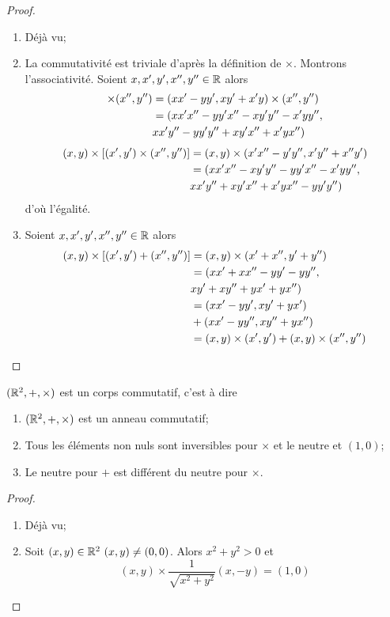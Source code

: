 \begin{proof}
  \begin{enumerate}
  \item Déjà vu;
  \item La commutativité est triviale d'après la définition de $\times$. Montrons l'associativité. Soient $x,x',y',x'',y'' \in \mathbb{R}$ alors
    \begin{align}
      [(x,y) \times (x',y')] \times (x'',y'') &= (xx'-yy',xy'+x'y) \times (x'',y'')\\
      &=(xx'x''-yy'x''-xy'y''-x'yy'', \notag \\
      &xx'y''-yy'y''+xy'x''+x'yx'')
    \end{align}
    \begin{align}
      (x,y)\times [(x',y') \times (x'',y'')] &= (x,y) \times (x'x''-y'y'',x'y''+x''y')\\
      &=(xx'x''-xy'y''-yy'x''-x'yy'', \notag \\
      & xx'y''+xy'x''+x'yx''-yy'y'')
    \end{align}
    d'où l'égalité.
  \item Soient $x,x',y',x'',y'' \in \mathbb{R}$ alors
    \begin{align}
      (x,y) \times [(x',y')+(x'',y'')] &= (x,y) \times (x'+x'',y'+y'')\\
      &=(xx'+xx''-yy'-yy'', \notag \\ &xy'+xy''+yx'+yx'')\\
      &=(xx'-yy',xy'+yx') \notag \\
      & + (xx'-yy'',xy''+yx'')\\
      &=(x,y) \times (x',y') +(x,y)\times (x'',y'')
    \end{align}
  \end{enumerate}
\end{proof}
\begin{prop}
  $(\mathbb{R}^2,+,\times)$ est un corps commutatif, c'est à dire
  \begin{enumerate}
  \item $(\mathbb{R}^2,+,\times)$ est un anneau commutatif;
  \item Tous les éléments non nuls sont inversibles pour $\times$ et le neutre et $(1,0)$;
  \item Le neutre pour $+$ est différent du neutre pour $\times$.
  \end{enumerate}
\end{prop}
\begin{proof}
  \begin{enumerate}
  \item Déjà vu;
  \item Soit $(x,y) \in \mathbb{R}^2 \ (x,y) \neq (0,0)$. Alors $x^2+y^2>0$ et
    \begin{equation}
      (x,y) \times \frac{1}{\sqrt{x^2+y^2}} (x,-y) = (1,0)
    \end{equation}
  \end{enumerate}
\end{proof}
